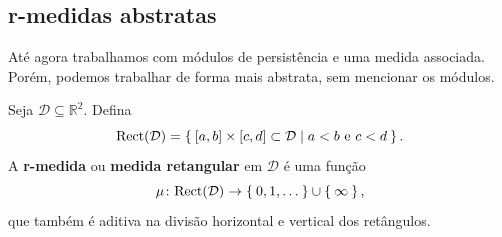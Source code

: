 \subsection{r-medidas abstratas}
Até agora trabalhamos com módulos de persistência e uma medida associada. Porém, podemos
trabalhar de forma mais abstrata, sem mencionar os módulos. 

\begin{defi}
    Seja $\mathcal{D} \subseteq \mathbb{R}^2$. Defina
    \begin{equation*}
        \text{Rect}(\mathcal{D}) = \Set{[a,b]\times[c,d] \subset \mathcal{D} | a < b \text{ e } c < d}.  
    \end{equation*} 
    A \textbf{r-medida} ou \textbf{medida retangular} em $\mathcal{D}$ é uma função
    \begin{equation*}
        \mu \colon \text{Rect}(\mathcal{D}) \to \Set{0,1,\dots} \cup \Set{\infty},
    \end{equation*}
    que também é aditiva na divisão horizontal e vertical dos retângulos. 
\end{defi}


